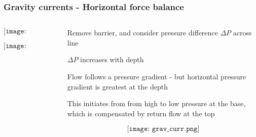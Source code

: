 \documentclass{beamer}
\begin{document}
\begin{frame}
  \frametitle{Gravity currents - Horizontal force balance}

  \begin{columns}[t]

    \begin{column}{0.5\paperwidth}

      \vspace{-1cm}
      
      $$\texttt{[image: isostatic.png]}$$

      \vspace{-1cm}
      
      $$\texttt{[image: hydrostat\_diff.pdf]}$$
      
    \end{column}

    \begin{column}{0.49\paperwidth}

      \vspace{-0.5cm}

      Remove barrier, and consider pressure difference $\Delta P$ across line \\

      \vspace{0.1cm}

      $\Delta P$ increases with depth \\

      \vspace{0.1cm}

      Flow follows a pressure gradient - but horizontal pressure gradient is greatest at the depth \\

      \vspace{0.1cm}

      This initiates from from high to low pressure at the base, which is compensated by return flow at the top \\

      \vspace{-0.5cm}
      
      $$\texttt{[image: grav\_curr.png]}$$
      
    \end{column}

  \end{columns}
  
\end{frame}
\end{document}
